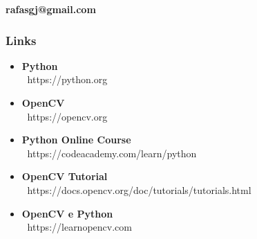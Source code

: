 \documentclass[aspectratio=169,14pt]{beamer}
\begin{document}
\begin{frame}[b]
    
    \begin{flushright}
    \color{white} \textbf{rafasgj@gmail.com}
    \end{flushright}

\end{frame}

\begin{frame}
    \frametitle{Links}
    \begin{itemize}
    \item{\textbf{Python} \\ $\:$ https://python.org}
    \item{\textbf{OpenCV} \\ $\:$ https://opencv.org}
    \item{\textbf{Python Online Course} \\ $\:$ https://codeacademy.com/learn/python}
    \item{\textbf{OpenCV Tutorial} \\ $\:$ https://docs.opencv.org/doc/tutorials/tutorials.html}
    \item{\textbf{OpenCV e Python} \\ $\:$ https://learnopencv.com}
    \end{itemize}
\end{frame}
\end{document}
